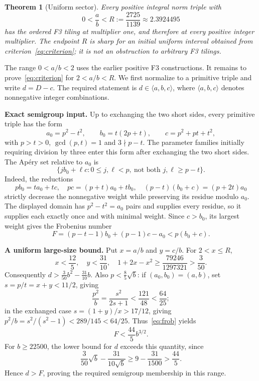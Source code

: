 \documentclass[11pt,a4paper]{article}
\newtheorem{theorem}{Theorem}
\newcommand{\sg}[1]{\langle #1\rangle}
\newcommand{\sect}[1]{\vspace{5pt}{\large\bfseries\color{ink}#1}\par\vspace{1pt}}
\begin{document}
\newpage
\sect{5. An entire all-multiplier F3 sector}
\begin{theorem}[Uniform sector]\label{thm:cone}
Every positive integral norm triple with
\[
 0<\frac ab< R:=\frac{2725}{1139}\approx2.3924495
\]
has the ordered F3 tiling at multiplier one, and therefore at every positive integer multiplier. The endpoint $R$ is sharp for an initial uniform interval obtained from criterion~\eqref{eq:criterion}; it is not an obstruction to arbitrary F3 tilings.
\end{theorem}

The range $0<a/b<2$ uses the earlier positive F3 constructions. It remains to prove~\eqref{eq:criterion} for $2<a/b<R$. We first normalize to a primitive triple and write $d=D-c$. The required statement is $d\in\sg{a,b,c}$, where $\sg{a,b,c}$ denotes nonnegative integer combinations.

\textbf{Exact semigroup input.} Up to exchanging the two short sides, every primitive triple has the form
\begin{equation}\label{eq:param}
 a_0=p^2-t^2,\qquad b_0=t(2p+t),\qquad c=p^2+pt+t^2,
\end{equation}
with $p>t>0$, $\gcd(p,t)=1$ and $3\nmid p-t$. The parameter families initially requiring division by three enter this form after exchanging the two short sides. The Ap\'ery set relative to $a_0$ is
\[
 \{j b_0+\ell c:0\le j,\ell<p,\ \text{not both }j,\ell\ge p-t\}.
\]
Indeed, the reductions
\[
 pb_0=t a_0+t c,\quad pc=(p+t)a_0+t b_0,\quad
 (p-t)(b_0+c)=(p+2t)a_0
\]
strictly decrease the nonnegative weight while preserving its residue modulo $a_0$. The displayed domain has $p^2-t^2=a_0$ pairs and supplies every residue, so it supplies each exactly once and with minimal weight. Since $c>b_0$, its largest weight gives the Frobenius number
\begin{equation}\label{eq:frob}
 F=(p-t-1)b_0+(p-1)c-a_0<p(b_0+c).
\end{equation}

\textbf{A uniform large-size bound.} Put $x=a/b$ and $y=c/b$. For $2<x\le R$,
\[
 x<\frac{12}{5},\quad y<\frac{31}{10},\quad
 1+2x-x^2\ge\frac{79246}{1297321}>\frac3{50}.
\]
Consequently $d>\frac3{50}b^2-\frac{31}{10}b$. Also $p<\frac85\sqrt b$: if $(a_0,b_0)=(a,b)$, set $s=p/t=x+y<11/2$, giving
\[
 \frac{p^2}{b}=\frac{s^2}{2s+1}<\frac{121}{48}<\frac{64}{25};
\]
in the exchanged case $s=(1+y)/x>17/12$, giving $p^2/b=s^2/(s^2-1)<289/145<64/25$. Thus~\eqref{eq:frob} yields
\[
 F<\frac{44}{5}b^{3/2}.
\]
For $b\ge22500$, the lower bound for $d$ exceeds this quantity, since
\[
 \frac3{50}\sqrt b-\frac{31}{10\sqrt b}
 \ge9-\frac{31}{1500}>\frac{44}{5}.
\]
Hence $d>F$, proving the required semigroup membership in this range.
\end{document}
